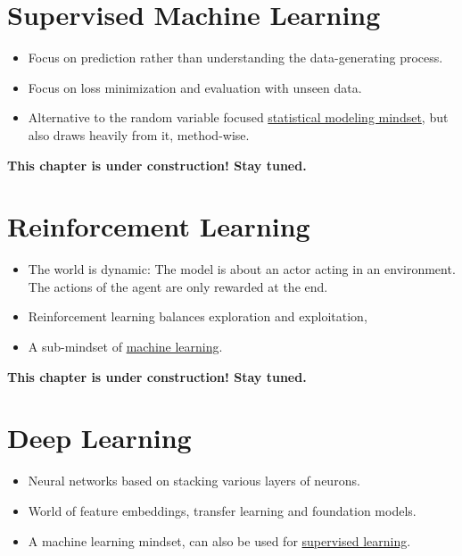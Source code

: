 \documentclass[
  10pt,
]{scrbook}
\providecommand{\tightlist}{%
  \setlength{\itemsep}{0pt}\setlength{\parskip}{0pt}}
\begin{document}
\hypertarget{supervised-ml}{%
\chapter{Supervised Machine Learning}\label{supervised-ml}}

\begin{itemize}
\tightlist
\item
  Focus on prediction rather than understanding the data-generating process.
\item
  Focus on loss minimization and evaluation with unseen data.
\item
  Alternative to the random variable focused \protect\hyperlink{statistical-modeling}{statistical modeling mindset}, but also draws heavily from it, method-wise.
\end{itemize}

\textbf{This chapter is under construction! Stay tuned.}

\hypertarget{reinforcement-learning}{%
\chapter{Reinforcement Learning}\label{reinforcement-learning}}

\begin{itemize}
\tightlist
\item
  The world is dynamic: The model is about an actor acting in an environment. The actions of the agent are only rewarded at the end.
\item
  Reinforcement learning balances exploration and exploitation,
\item
  A sub-mindset of \protect\hyperlink{machine-learning}{machine learning}.
\end{itemize}

\textbf{This chapter is under construction! Stay tuned.}

\hypertarget{deep-learning}{%
\chapter{Deep Learning}\label{deep-learning}}

\begin{itemize}
\tightlist
\item
  Neural networks based on stacking various layers of neurons.
\item
  World of feature embeddings, transfer learning and foundation models.
\item
  A machine learning mindset, can also be used for \protect\hyperlink{supervised-ml}{supervised learning}.
\end{itemize}
\end{document}
